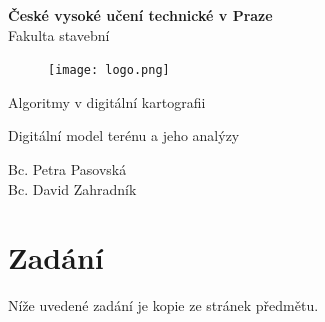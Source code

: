 \documentclass[a4paper, 12pt]{article}
\begin{document}
\begin{titlepage}
\begin{center}
\noindent
\Large \textbf{České vysoké učení technické v Praze }\\ Fakulta stavební
\vspace{5cm}

\huge

\begin{figure}[h!]
	\centering
	\texttt{[image: logo.png]}
\end{figure}

\vspace{0.5cm}

Algoritmy v digitální kartografii \\

\vspace{3cm}

\Huge  
Digitální model terénu a jeho analýzy\\

\vspace{2cm}

\Large
Bc. Petra Pasovská \\
Bc. David Zahradník \\

\end{center}

\end{titlepage}




\pagestyle{plain}     %
\setcounter{page}{1}  %

\tableofcontents
\newpage

\section{Zadání}
Níže uvedené zadání je kopie ze stránek předmětu. 
\end{document}
